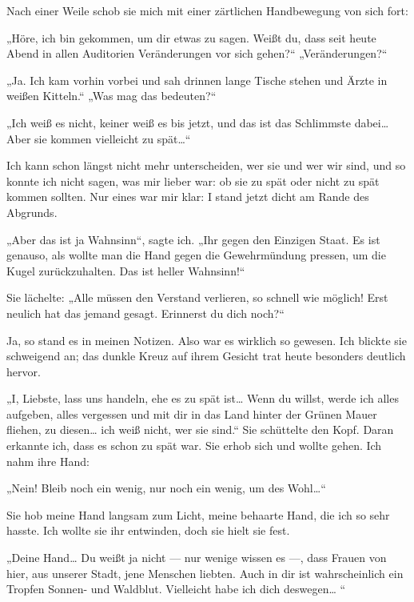 Nach einer Weile schob sie mich mit einer zärtlichen Handbewegung
von sich fort:

„Höre, ich bin gekommen, um dir etwas zu sagen. Weißt du, dass seit
heute Abend in allen Auditorien Veränderungen vor sich gehen?“
„Veränderungen?“

„Ja. Ich kam vorhin vorbei und sah drinnen lange Tische stehen und
Ärzte in weißen Kitteln.“ „Was mag das bedeuten?“

„Ich weiß es nicht, keiner weiß es bis jetzt, und das ist das
Schlimmste dabei\ldots{} Aber sie kommen vielleicht zu spät\ldots{}“

Ich kann schon längst nicht mehr unterscheiden, wer sie und wer wir
sind, und so konnte ich nicht sagen, was mir lieber war: ob sie zu
spät oder nicht zu spät kommen sollten. Nur eines war mir klar: I
stand jetzt dicht am Rande des Abgrunds.

„Aber das ist ja Wahnsinn“, sagte ich. „Ihr gegen den Einzigen
Staat. Es ist genauso, als wollte man die Hand
gegen die Gewehrmündung pressen, um die Kugel zurückzuhalten. Das
ist heller Wahnsinn!“

Sie lächelte: „Alle müssen den Verstand verlieren, so schnell wie
möglich! Erst neulich hat das jemand gesagt. Erinnerst du dich
noch?“

Ja, so stand es in meinen Notizen. Also war es wirklich so gewesen.
Ich blickte sie schweigend an; das dunkle Kreuz auf ihrem Gesicht
trat heute besonders deutlich hervor.

„I, Liebste, lass uns handeln, ehe es zu spät ist\ldots{} Wenn du
willst, werde ich alles aufgeben, alles vergessen und mit dir in
das Land hinter der Grünen Mauer fliehen, zu diesen\ldots{} ich weiß
nicht, wer sie sind.“ Sie schüttelte den Kopf. Daran erkannte ich,
dass es schon zu spät war. Sie erhob sich und wollte gehen. Ich
nahm ihre Hand:

„Nein! Bleib noch ein wenig, nur noch ein wenig, um des Wohl\ldots{}“

Sie hob meine Hand langsam zum Licht, meine behaarte Hand, die ich
so sehr hasste. Ich wollte sie ihr entwinden, doch sie hielt sie
fest.

„Deine Hand\ldots{} Du weißt ja nicht — nur wenige wissen es —, dass
Frauen von hier, aus unserer Stadt, jene Menschen liebten. Auch in
dir ist wahrscheinlich ein Tropfen Sonnen- und Waldblut. Vielleicht
habe ich dich deswegen\ldots{} “

